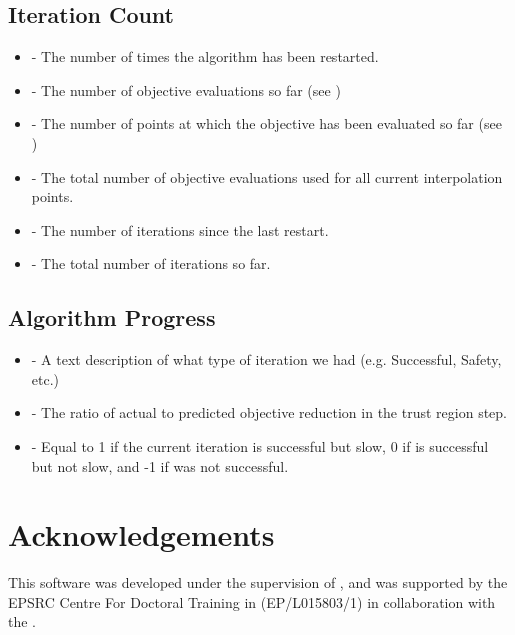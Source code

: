 \documentclass[letterpaper,10pt,english]{sphinxmanual}
\begin{document}
\section{Iteration Count}
\label{\detokenize{diagnostic:iteration-count}}\begin{itemize}
\item {} 
 - The number of times the algorithm has been restarted.

\item {} 
 - The number of objective evaluations so far (see )

\item {} 
 - The number of points at which the objective has been evaluated so far (see )

\item {} 
 - The total number of objective evaluations used for all current interpolation points.

\item {} 
 - The number of iterations since the last restart.

\item {} 
 - The total number of iterations so far.

\end{itemize}


\section{Algorithm Progress}
\label{\detokenize{diagnostic:algorithm-progress}}\begin{itemize}
\item {} 
 - A text description of what type of iteration we had (e.g. Successful, Safety, etc.)

\item {} 
 - The ratio of actual to predicted objective reduction in the trust region step.

\item {} 
 - Equal to 1 if the current iteration is successful but slow, 0 if is successful but not slow, and -1 if was not successful.

\end{itemize}


\chapter{Acknowledgements}
\label{\detokenize{index:acknowledgements}}
This software was developed under the supervision of , and was supported by the EPSRC Centre For Doctoral Training in  (EP/L015803/1) in collaboration with the .
\end{document}
